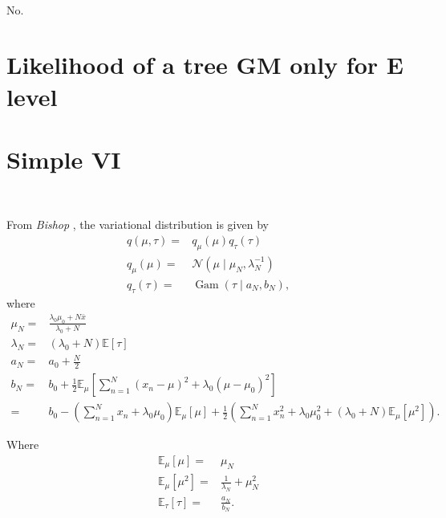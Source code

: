 \documentclass[11pt]{extarticle}
\newcommand{\N}{\mathcal{N}}
\newcommand{\0}{\mathbf{0}}
\renewcommand{\(}{\left(}
\renewcommand{\)}{\right)}
\DeclareMathOperator{\Gam}{Gam}
\theoremstyle{definition}
\begin{document}
\noindent{} \\
\par No.


\section{Likelihood of a tree GM only for E level}


\newpage
\section{Simple VI}
\noindent{} \\
\par From \textit{Bishop} \cite{Bishop}, the variational distribution is given by
\begin{align*}
    q(\mu, \tau) =& q_{\mu}(\mu) q_{\tau}(\tau) \\
    q_{\mu}(\mu) =& \N(\mu \mid \mu_{N}, \lambda_{N}^{-1}) \\
    q_{\tau}(\tau) =& \Gam(\tau \mid a_{N}, b_{N}),
\end{align*}
where
\begin{align*}
    \mu_{N} =& \frac{\lambda_{0}\mu_{0} + N\bar{x}}{\lambda_{0} + N} \\
    \lambda_{N} =& (\lambda_{0} + N) \mathbb{E}\left[\tau\right] \\
    a_{N} =& a_{0} + \frac{N}{2} \\
    b_{N} =& b_{0} + \frac{1}{2} \mathbb{E}_{\mu}\left[\sum_{n=1}^{N}(x_{n}-\mu)^{2} + \lambda_{0}(\mu-\mu_{0})^{2}\right] \\
    =& b_{0} - \left(\sum_{n=1}^{N}x_{n} + \lambda_{0}\mu_{0}\right)\mathbb{E}_{\mu}[\mu] + \frac{1}{2}\left(\sum_{n=1}^{N}x_{n}^{2} + \lambda_{0}\mu_{0}^{2} + (\lambda_{0} + N)\mathbb{E}_{\mu}[\mu^{2}]\right).
\end{align*}
\par Where
\begin{align*}
	\mathbb{E}_{\mu}[\mu] =& \mu_{N} \\
	\mathbb{E}_{\mu}[\mu^{2}] =& \frac{1}{\lambda_{N}} + \mu_{N}^{2} \\
	\mathbb{E}_{\tau}[\tau] =& \frac{a_{N}}{b_{N}}.
\end{align*}
\end{document}
